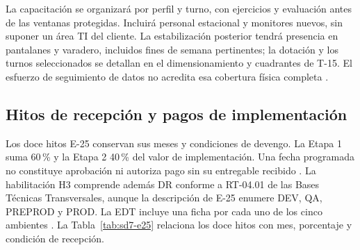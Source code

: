 La capacitación se organizará por perfil y turno, con ejercicios y evaluación antes de las ventanas protegidas. Incluirá personal estacional y monitores nuevos, sin suponer un área TI del cliente. La estabilización posterior tendrá presencia en pantalanes y varadero, incluidos fines de semana pertinentes; la dotación y los turnos seleccionados se detallan en el dimensionamiento y cuadrantes de T-15. El esfuerzo de seguimiento de datos no acredita esa cobertura física completa \parencite[cap.~22, RT-22.01--RT-22.07; p.~38]{bases-transversales}.




\subsection{Hitos de recepción y pagos de implementación} %
Los doce hitos E-25 conservan sus meses y condiciones de devengo. La Etapa 1 suma 60\,\% y la Etapa 2 40\,\% del valor de implementación. Una fecha programada no constituye aprobación ni autoriza pago sin su entregable recibido \parencite[Formulario~E-25; p.~74]{bases-admin}.
La habilitación H3 comprende además DR conforme a RT-04.01 de las Bases Técnicas Transversales, aunque la descripción de E-25 enumere DEV, QA, PREPROD y PROD. La EDT incluye una ficha por cada uno de los cinco ambientes \parencite[RT-04.01; pp.~10--11]{bases-transversales}.
La Tabla~\ref{tab:sd7-e25} relaciona los doce hitos con mes, porcentaje y condición de recepción.

